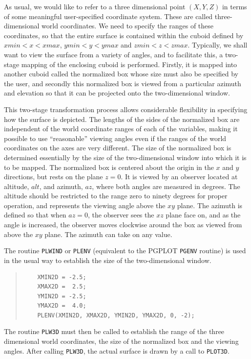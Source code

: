 \documentclass[twoside,11pt]{article}
\begin{document}
As usual, we would like to refer to a three dimensional point $(X, Y, Z)$ in terms of some meaningful user-specified coordinate system. These are
called three-dimensional world coordinates. We need to specify the ranges of these coordinates, so that the entire surface is contained within the
cuboid defined by $xmin<x<xmax$, $ymin<y<ymax$ and $zmin<z<zmax$. Typically, we shall want to view the surface from a variety of angles, and to facilitate
this, a two-stage mapping of the enclosing cuboid is performed. Firstly, it is mapped into another cuboid called the normalized box whose size must
also be specified by the user, and secondly this normalized box is viewed from a particular azimuth and elevation so that it can be projected onto the
two-dimensional window. 

This two-stage transformation process allows considerable flexibility in specifying how the surface is depicted. The lengths of the sides of the
normalized box are independent of the world coordinate ranges of each of the variables, making it possible to use ``reasonable'' viewing angles even
if the ranges of the world coordinates on the axes are very different. The size of the normalized box is determined essentially by the size of the
two-dimensional window into which it is to be mapped. The normalized box is centered about the origin in the $x$ and $y$ directions, but rests on the
plane $z = 0$. It is viewed by an observer located at altitude, $alt$, and azimuth, $az$, where both angles are measured in degrees. The altitude should be
restricted to the range zero to ninety degrees for proper operation, and represents the viewing angle above the $xy$ plane. The azimuth is defined so
that when $az = 0$, the observer sees the $xz$ plane face on, and as the angle is increased, the observer moves clockwise around the box as viewed
from above the $xy$ plane. The azimuth can take on any value. 

The routine {\tt PLWIND} or {\tt PLENV} (equivalent to the PGPLOT {\tt PGENV} routine) is used in the usual way to establish the size of the two-dimensional window. 

\small
\begin{quote}
\begin{verbatim}
    XMIN2D = -2.5;
    XMAX2D =  2.5;
    YMIN2D = -2.5;
    YMAX2D =  4.0;
    PLENV(XMIN2D, XMAX2D, YMIN2D, YMAX2D, 0, -2);
\end{verbatim}
\end{quote}
\normalsize

The routine {\tt PLW3D} must then be called to establish the range of the three dimensional world coordinates, the size of the normalized box and the viewing angles. After calling {\tt PLW3D}, the actual surface is drawn by a call to {\tt PLOT3D}. 
\end{document}
